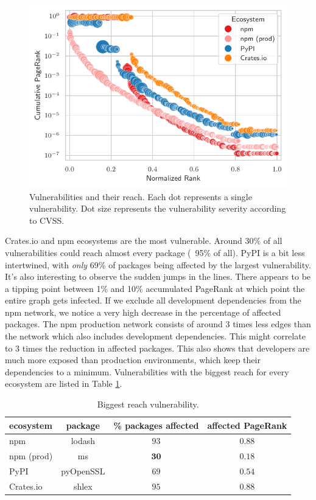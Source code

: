 \documentclass[9pt,twocolumn,twoside]{pnas-report}
\begin{document}
\begin{figure}[t]\centering%
	\includegraphics[width=\linewidth]{vuln_pagerank}
	\caption{Vulnerabilities and their reach. Each dot represents a single vulnerability. Dot size represents the vulnerability severity according to CVSS.  }
	\label{fig:reach}
\end{figure}

Crates.io and npm ecosystems are the most vulnerable.
Around 30\% of all vulnerabilities could reach almost every package (~95\% of all).
PyPI is a bit less intertwined, with \textit{only} 69\% of packages being affected by the largest vulnerability.
It's also interesting to observe the sudden jumps in the lines.
There appears to be a tipping point between 1\% and 10\% accumulated PageRank at which point the entire graph gets infected.
If we exclude all development dependencies from the npm network, we notice a very high decrease in the percentage of affected packages.
The npm production network consists of around 3 times less edges than the network which also includes development dependencies.
This might correlate to 3 times the reduction in affected packages.
This also shows that developers are much more exposed than production environments, which keep their dependencies to a minimum.
Vulnerabilities with the biggest reach for every ecosystem are listed in Table \ref{tab:highest_reach}.

\begin{table}[h]\centering%
	\caption{Biggest reach vulnerability.}
	\begin{tabular}{l|ccc}
		ecosystem  & package   & \% packages affected & affected PageRank \\\hline
		npm        & lodash    & $93$                 & $0.88$            \\
		npm (prod) & ms        & $\mathbf{30}$        & $\mathbf{0.18}$   \\
		PyPI       & pyOpenSSL & $69$                 & $0.54$            \\
		Crates.io  & shlex     & $95$                 & $0.88$            \\
	\end{tabular}
	\label{tab:highest_reach}
\end{table}
\end{document}

